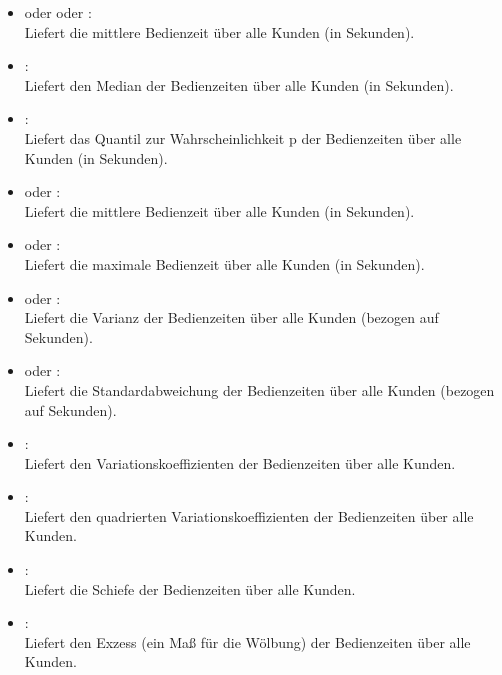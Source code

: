 \begin{itemize}

\item
{} oder  oder :\\
Liefert die mittlere Bedienzeit über alle Kunden (in Sekunden).

\item
{}:\\
Liefert den Median der Bedienzeiten über alle Kunden (in Sekunden).

\item
{}:\\
Liefert das Quantil zur Wahrscheinlichkeit p der Bedienzeiten über alle Kunden (in Sekunden).

\item
{} oder :\\
Liefert die mittlere Bedienzeit über alle Kunden (in Sekunden).

\item
{} oder :\\
Liefert die maximale Bedienzeit über alle Kunden (in Sekunden).

\item
{} oder :\\
Liefert die Varianz der Bedienzeiten über alle Kunden (bezogen auf Sekunden).

\item
{} oder :\\
Liefert die Standardabweichung der Bedienzeiten über alle Kunden (bezogen auf Sekunden).

\item
{}:\\
Liefert den Variationskoeffizienten der Bedienzeiten über alle Kunden.

\item
{}:\\
Liefert den quadrierten Variationskoeffizienten der Bedienzeiten über alle Kunden.

\item
{}:\\
Liefert die Schiefe der Bedienzeiten über alle Kunden.

\item
{}:\\
Liefert den Exzess (ein Maß für die Wölbung) der Bedienzeiten über alle Kunden.


\end{itemize}
